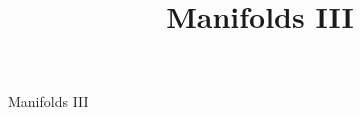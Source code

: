 \documentclass[11pt]{article}
\date{}
\title{Manifolds III}
\begin{document}
{\centering
{\LARGE Manifolds III \par }}
\end{document}
